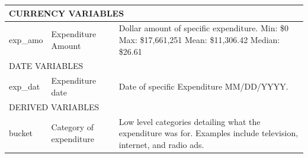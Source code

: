 \documentclass[11pt]{article}\usepackage{graphicx, color}
\begin{document}
\begin{table}[h!]
\begin{tabular}[\textwidth]{l l p{}}
\hline
\multicolumn{3}{l}{\MakeTextUppercase{Currency Variables}}\\
\hline
exp\_amo & Expenditure Amount & Dollar amount of specific expenditure. \newline 
Min: \$0 \newline
Max: \$17,661,251 \newline
Mean: \$11,306.42 \newline
Median: \$26.61\\
\hline
\multicolumn{3}{l}{\MakeTextUppercase{Date Variables}}\\
\hline
exp\_dat &  Expenditure date & Date of specific Expenditure	MM/DD/YYYY.\\
\hline
\multicolumn{3}{l}{\MakeTextUppercase{Derived Variables}}\\
\hline
bucket & Category of expenditure & Low level categories detailing what the expenditure was for. Examples include television, internet, and radio ads.\\

\end{tabular}
\end{table}
\end{document}
